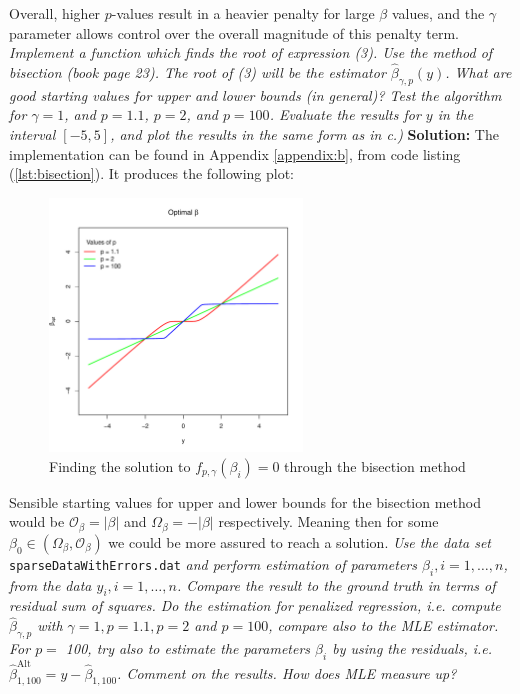 Overall, higher $p$-values result in a heavier penalty for large $\beta$ values, and the $\gamma$ parameter allows control over the overall magnitude of this penalty term.
\emph{Implement a function which finds the root of expression (3). Use the method of bisection (book page 23). The root of (3) will be the estimator $\hat{\beta}_{\gamma, p}(y)$. What are good starting values for upper and lower bounds (in general)? Test the algorithm for $\gamma = 1$, and $p = 1.1$, $p = 2$, and $p = 100$. Evaluate the results for $y$ in the interval $[-5, 5]$, and plot the results in the same form as in c.)} \spaze 
\textbf{Solution:} \spaze
The implementation can be found in Appendix \ref{appendix:b}, from code listing  (\ref{lst:bisection}). It produces the following plot: 
\begin{figure}[H]
  \centering
  \includegraphics[width=0.6\textwidth]{Images/Figures_Exercise_1/bisection_plots.pdf}
  \caption{Finding the solution to $f_{p, \gamma}(\beta_i) = 0$ through the bisection method}
  \label{fig:example}
\end{figure}
Sensible starting values for upper and lower bounds for the bisection method would be $\mathcal{O}_{\beta} = |\beta|$ and $\Omega_{\beta} = -|\beta| $ respectively. Meaning then for some $\beta_0 \in (\Omega_{\beta} , \mathcal{O}_{\beta})$ we could be more assured to reach a solution.
\emph{Use the data set} \texttt{sparseDataWithErrors.dat} \emph{and perform estimation of parameters $\beta_i, i=1, \ldots, n$, from the data $y_i, i=1, \ldots, n$. Compare the result to the ground truth in terms of residual sum of squares. Do the estimation for penalized regression, i.e. compute $\hat{\beta}_{\gamma, p}$ with $\gamma=1, p=1.1, p=2$ and $p=100$, compare also to the MLE estimator. For $p=$ 100, try also to estimate the parameters $\beta_i$ by using the residuals, i.e. $\hat{\beta}_{1,100}^{\text {Alt }}=y-\hat{\beta}_{1,100}$. Comment on the results. How does MLE measure up?} \spaze 
